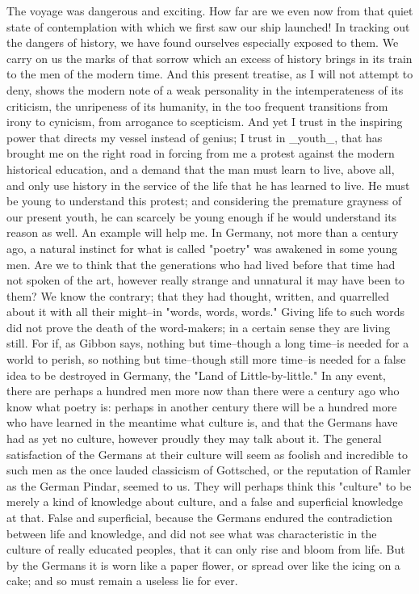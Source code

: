 The voyage was dangerous and exciting. How far are we even now from
that quiet state of contemplation with which we first saw our ship
launched! In tracking out the dangers of history, we have found
ourselves especially exposed to them. We carry on us the marks of
that sorrow which an excess of history brings in its train to the men
of the modern time. And this present treatise, as I will not attempt
to deny, shows the modern note of a weak personality in the
intemperateness of its criticism, the unripeness of its humanity, in
the too frequent transitions from irony to cynicism, from arrogance
to scepticism. And yet I trust in the inspiring power that directs my
vessel instead of genius; I trust in _youth_, that has brought me on
the right road in forcing from me a protest against the modern
historical education, and a demand that the man must learn to live,
above all, and only use history in the service of the life that he
has learned to live. He must be young to understand this protest; and
considering the premature grayness of our present youth, he can
scarcely be young enough if he would understand its reason as well.
An example will help me. In Germany, not more than a century ago, a
natural instinct for what is called "poetry" was awakened in some
young men. Are we to think that the generations who had lived before
that time had not spoken of the art, however really strange and
unnatural it may have been to them? We know the contrary; that they
had thought, written, and quarrelled about it with all their
might--in "words, words, words." Giving life to such words did not
prove the death of the word-makers; in a certain sense they are
living still. For if, as Gibbon says, nothing but time--though a long
time--is needed for a world to perish, so nothing but time--though
still more time--is needed for a false idea to be destroyed in
Germany, the "Land of Little-by-little." In any event, there are
perhaps a hundred men more now than there were a century ago who know
what poetry is: perhaps in another century there will be a hundred
more who have learned in the meantime what culture is, and that the
Germans have had as yet no culture, however proudly they may talk
about it. The general satisfaction of the Germans at their culture
will seem as foolish and incredible to such men as the once lauded
classicism of Gottsched, or the reputation of Ramler as the German
Pindar, seemed to us. They will perhaps think this "culture" to be
merely a kind of knowledge about culture, and a false and superficial
knowledge at that. False and superficial, because the Germans endured
the contradiction between life and knowledge, and did not see what
was characteristic in the culture of really educated peoples, that it
can only rise and bloom from life. But by the Germans it is worn like
a paper flower, or spread over like the icing on a cake; and so must
remain a useless lie for ever.

